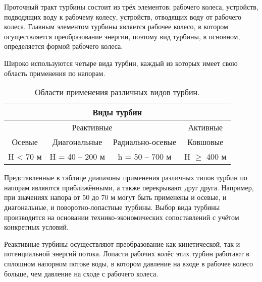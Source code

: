 Проточный тракт турбины состоит из трёх элементов: рабочего колеса, устройств, подводящих воду к рабочему колесу, устройств, отводящих воду от рабочего колеса. Главным элементом турбины является рабочее колесо, в котором осуществляется преобразование энергии, поэтому вид турбины, в основном, определяется формой рабочего колеса.

Широко используются четыре вида турбин, каждый из которых имеет свою область применения по напорам.

\begin{table}[ht]
\caption{Области применения различных видов турбин.}
\label{tab_1}
\centering


\begin{tabular}{|c|c|c|c|}

\hline

\multicolumn{4}{|c|}{   Виды турбин}\\
\hline

\multicolumn{3}{|c|}{Реактивные} & Активные\\

\hline
  Осевые & Диагональные & Радиально-осевые & Ковшовые\\ 
 
  
\hline
H < 70 м & H = 40 -- 200 м & h = 50 -- 700 м & H $ \geqslant $ 400 м\\
\hline

\end{tabular}


\end{table}

\vspace{0.5 cm}

Представленные в таблице диапазоны применения различных типов турбин по напорам являются приближёнными, а также перекрывают друг друга. Например, при значениях напора от 50 до 70 м могут быть применены и осевые, и диагональные, и поворотно-лопастные турбины. Выбор вида турбины производится на основании технико-экономических сопоставлений с учётом конкретных условий.

Реактивные турбины осуществляют преобразование как кинетической, так и потенциальной энергий потока. Лопасти рабочих колёс этих турбин работают в сплошном напорном потоке воды, в котором давление на входе в рабочее колесо больше, чем давление на сходе с рабочего колеса.

